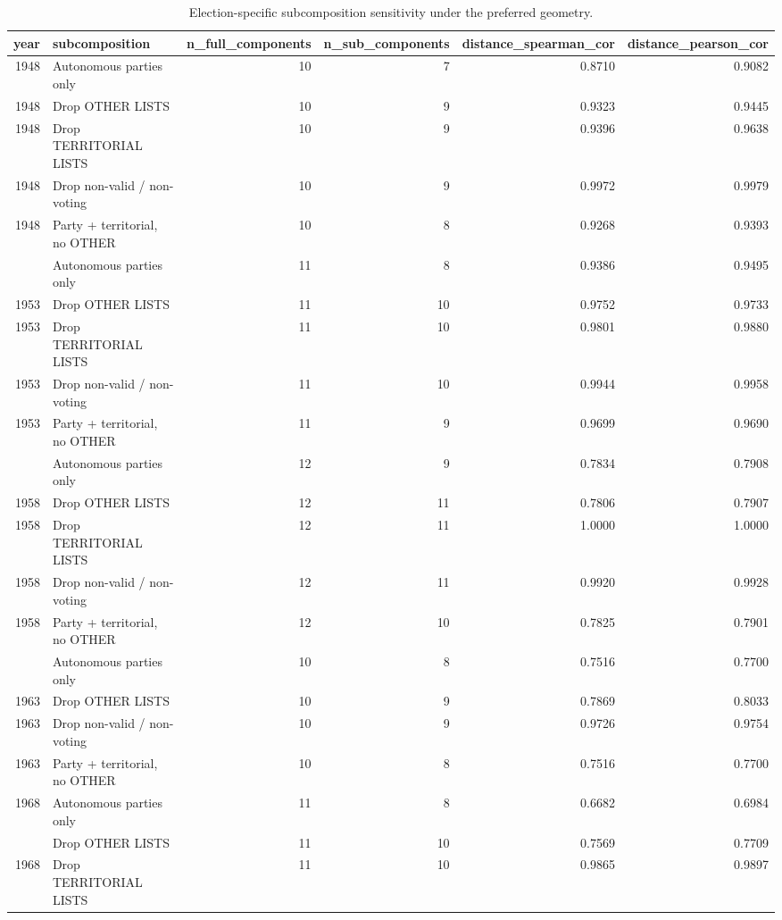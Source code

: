 
\begin{longtable}[t]{rlrrrr}
\caption{\label{tab:app_subcomposition_preferred}Election-specific subcomposition sensitivity under the preferred geometry.}\\
\toprule
year & subcomposition & n\_full\_components & n\_sub\_components & distance\_spearman\_cor & distance\_pearson\_cor\\
\midrule
1948 & Autonomous parties only & 10 & 7 & 0.8710 & 0.9082\\
1948 & Drop OTHER LISTS & 10 & 9 & 0.9323 & 0.9445\\
1948 & Drop TERRITORIAL LISTS & 10 & 9 & 0.9396 & 0.9638\\
1948 & Drop non-valid / non-voting & 10 & 9 & 0.9972 & 0.9979\\
1948 & Party + territorial, no OTHER & 10 & 8 & 0.9268 & 0.9393\\
\addlinespace
1953 & Autonomous parties only & 11 & 8 & 0.9386 & 0.9495\\
1953 & Drop OTHER LISTS & 11 & 10 & 0.9752 & 0.9733\\
1953 & Drop TERRITORIAL LISTS & 11 & 10 & 0.9801 & 0.9880\\
1953 & Drop non-valid / non-voting & 11 & 10 & 0.9944 & 0.9958\\
1953 & Party + territorial, no OTHER & 11 & 9 & 0.9699 & 0.9690\\
\addlinespace
1958 & Autonomous parties only & 12 & 9 & 0.7834 & 0.7908\\
1958 & Drop OTHER LISTS & 12 & 11 & 0.7806 & 0.7907\\
1958 & Drop TERRITORIAL LISTS & 12 & 11 & 1.0000 & 1.0000\\
1958 & Drop non-valid / non-voting & 12 & 11 & 0.9920 & 0.9928\\
1958 & Party + territorial, no OTHER & 12 & 10 & 0.7825 & 0.7901\\
\addlinespace
1963 & Autonomous parties only & 10 & 8 & 0.7516 & 0.7700\\
1963 & Drop OTHER LISTS & 10 & 9 & 0.7869 & 0.8033\\
1963 & Drop non-valid / non-voting & 10 & 9 & 0.9726 & 0.9754\\
1963 & Party + territorial, no OTHER & 10 & 8 & 0.7516 & 0.7700\\
1968 & Autonomous parties only & 11 & 8 & 0.6682 & 0.6984\\
\addlinespace
1968 & Drop OTHER LISTS & 11 & 10 & 0.7569 & 0.7709\\
1968 & Drop TERRITORIAL LISTS & 11 & 10 & 0.9865 & 0.9897\\

\end{longtable}
